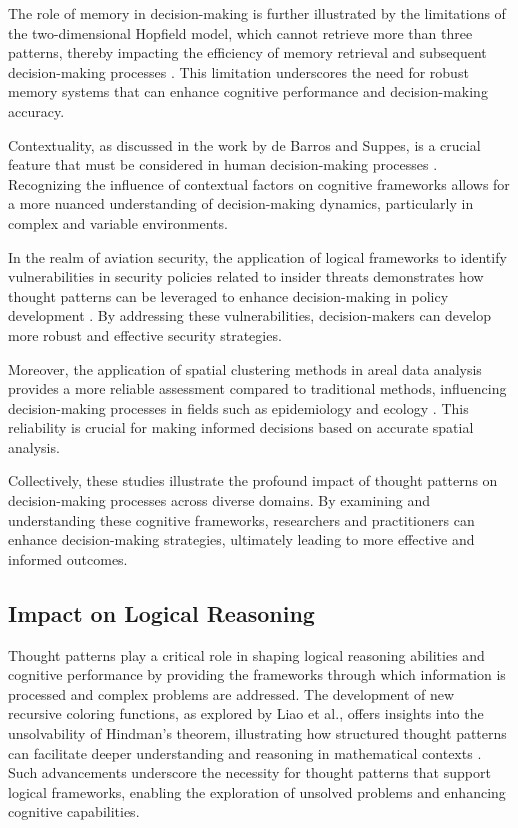 The role of memory in decision-making is further illustrated by the limitations of the two-dimensional Hopfield model, which cannot retrieve more than three patterns, thereby impacting the efficiency of memory retrieval and subsequent decision-making processes \cite{koyama2001storagecapacitytwodimensionalneural}. This limitation underscores the need for robust memory systems that can enhance cognitive performance and decision-making accuracy.

Contextuality, as discussed in the work by de Barros and Suppes, is a crucial feature that must be considered in human decision-making processes \cite{debarros2015examplescontextualityphysicsimplications}. Recognizing the influence of contextual factors on cognitive frameworks allows for a more nuanced understanding of decision-making dynamics, particularly in complex and variable environments.

In the realm of aviation security, the application of logical frameworks to identify vulnerabilities in security policies related to insider threats demonstrates how thought patterns can be leveraged to enhance decision-making in policy development \cite{kammller2020applyingisabelleinsiderframework}. By addressing these vulnerabilities, decision-makers can develop more robust and effective security strategies.

Moreover, the application of spatial clustering methods in areal data analysis provides a more reliable assessment compared to traditional methods, influencing decision-making processes in fields such as epidemiology and ecology \cite{vidanapathirana2022clusterdetectioncapabilitiesaverage}. This reliability is crucial for making informed decisions based on accurate spatial analysis.

Collectively, these studies illustrate the profound impact of thought patterns on decision-making processes across diverse domains. By examining and understanding these cognitive frameworks, researchers and practitioners can enhance decision-making strategies, ultimately leading to more effective and informed outcomes.

\subsection{Impact on Logical Reasoning} \label{subsec:Impact on Logical Reasoning}



Thought patterns play a critical role in shaping logical reasoning abilities and cognitive performance by providing the frameworks through which information is processed and complex problems are addressed. The development of new recursive coloring functions, as explored by Liao et al., offers insights into the unsolvability of Hindman's theorem, illustrating how structured thought patterns can facilitate deeper understanding and reasoning in mathematical contexts \cite{liao2023recursivecoloringfunctionpi30}. Such advancements underscore the necessity for thought patterns that support logical frameworks, enabling the exploration of unsolved problems and enhancing cognitive capabilities.



